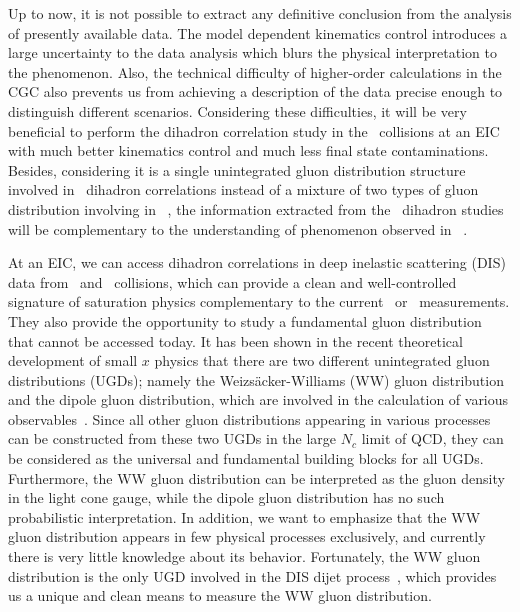 Up to now, it is not possible to extract any definitive conclusion from the
analysis of presently available data. The model dependent kinematics control
introduces a large uncertainty to the data analysis which blurs the
physical interpretation to the phenomenon. Also, the technical difficulty of
higher-order calculations in the CGC also prevents us from achieving a
description of the data precise enough to distinguish different scenarios.
Considering these difficulties, it will be very beneficial to perform the
dihadron correlation study in the \eA\ collisions at an EIC with much better
kinematics control and much less final state contaminations. Besides,
considering it is a single unintegrated gluon distribution structure involved in
\eA\ dihadron correlations instead of a mixture of two types of gluon distribution
involving in \dA\ , the information extracted from the \eA\ dihadron studies will
be complementary to the understanding of phenomenon observed in \dA\ .



At an EIC, we can access dihadron correlations in deep inelastic scattering
(DIS) data from \eA\ and \ep\ collisions, which can provide a clean and
well-controlled signature of saturation physics complementary to the current \dA\
or \pA\ measurements. They also provide the opportunity to study a fundamental
gluon distribution that cannot be accessed today. It has been shown in the
recent theoretical development of small $x$ physics that there are two different
unintegrated gluon distributions (UGDs); namely the Weizs\"{a}cker-Williams (WW)
gluon distribution and the dipole gluon distribution, which are involved in the
calculation of various observables~\cite{Dominguez:2010xd}. Since all other
gluon distributions appearing in various processes can be constructed from these
two UGDs in the large $N_c$ limit of QCD, they can be considered as the
universal and fundamental building blocks for all UGDs. Furthermore, the WW
gluon distribution can be interpreted as the gluon density in the light cone
gauge, while the dipole gluon distribution has no such probabilistic
interpretation. In addition, we want to emphasize that the WW gluon distribution
appears in few physical processes exclusively, and currently there is very
little knowledge about its behavior. Fortunately, the WW gluon distribution is
the only UGD involved in the DIS dijet process~\cite{Dominguez:2011wm}, which
provides us a unique and clean means to measure the WW gluon distribution.



